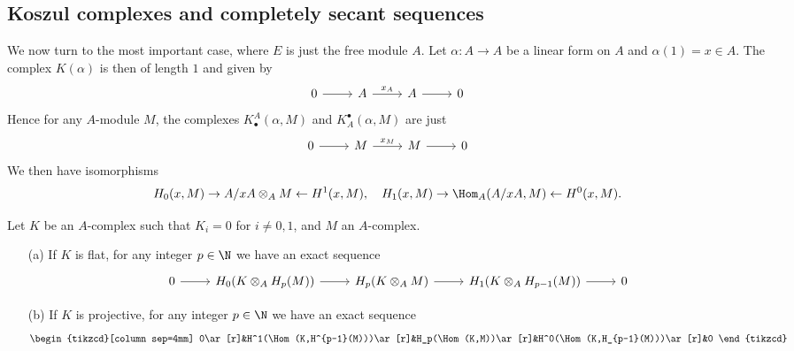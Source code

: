 \subsection{Koszul complexes and completely secant sequences}
We now turn to the most important case, where $E$ is just the free module $A$. Let $\alpha:A\to A$ be a linear form on $A$ and $\alpha(1)=x\in A$. The complex $K(\alpha)$ is then of length $1$ and given by
\[\begin{tikzcd}
0\ar[r]&A\ar[r,"x_A"]&A\ar[r]&0
\end{tikzcd}\]
Hence for any $A$-module $M$, the complexes $K_\bullet^A(\alpha,M)$ and $K^\bullet_A(\alpha,M)$ are just
\[\begin{tikzcd}
0\ar[r]&M\ar[r,"x_M"]&M\ar[r]&0
\end{tikzcd}\]
We then have isomorphisms
\[H_0(x,M)\to A/xA\otimes_AM\leftarrow H^1(x,M),\quad H_1(x,M)\to\Hom_A(A/xA,M)\leftarrow H^0(x,M).\]
\begin{lemma}\label{module complex tensoring and Hom with homology lemma}
Let $K$ be an $A$-complex such that $K_i=0$ for $i\neq 0,1$, and $M$ an $A$-complex.
\begin{itemize}
\item[(a)] If $K$ is flat, for any integer $p\in\N$ we have an exact sequence
\[\begin{tikzcd}
0\ar[r]&H_0(K\otimes_AH_p(M))\ar[r]&H_p(K\otimes_AM)\ar[r]&H_1(K\otimes_AH_{p-1}(M))\ar[r]&0
\end{tikzcd}\] 
\item[(b)] If $K$ is projective, for any integer $p\in\N$ we have an exact sequence
\[\begin{tikzcd}[column sep=4mm]
0\ar[r]&H^1(\Hom(K,H^{p-1}(M)))\ar[r]&H_p(\Hom(K,M))\ar[r]&H^0(\Hom(K,H_{p-1}(M)))\ar[r]&0
\end{tikzcd}\] 
\end{itemize}
\end{lemma}
